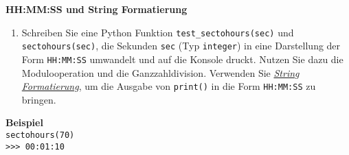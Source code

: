 \textbf{HH:MM:SS und String Formatierung}
\begin{enumerate}
	\item  Schreiben Sie eine Python Funktion \verb|test_sectohours(sec)| und \verb|sectohours(sec)|, die Sekunden \texttt{sec} (Typ \verb|integer|) in eine Darstellung der Form \verb|HH:MM:SS| umwandelt und auf die Konsole druckt. Nutzen Sie dazu die Modulooperation und die Ganzzahldivision. Verwenden Sie \href{https://docs.python.org/3/library/stdtypes.html#str.format}{\textit{String Formatierung}}, um die Ausgabe von \texttt{print()} in die Form \verb|HH:MM:SS| zu bringen.
\end{enumerate}

\textbf{Beispiel}\\
\texttt{sectohours(70)}\\
\verb|>>> 00:01:10|\\